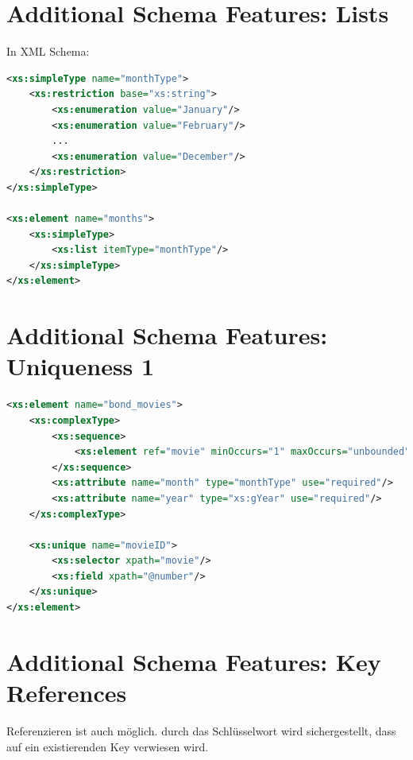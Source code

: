 \section{Additional Schema Features: Lists}
In XML Schema:
\begin{lstlisting}[language=XML, caption={Sequences with Global Definitions}]
<xs:simpleType name="monthType"> 
	<xs:restriction base="xs:string">
		<xs:enumeration value="January"/> 
		<xs:enumeration value="February"/> 
		...
		<xs:enumeration value="December"/> 
	</xs:restriction>
</xs:simpleType>

<xs:element name="months">
	<xs:simpleType>
		<xs:list itemType="monthType"/>
	</xs:simpleType>
</xs:element>
\end{lstlisting}

\section{Additional Schema Features: Uniqueness 1}

\begin{lstlisting}[language=XML, caption={Sequences with Global Definitions}]
<xs:element name="bond_movies"> 
	<xs:complexType>
		<xs:sequence>
			<xs:element ref="movie" minOccurs="1" maxOccurs="unbounded"/>
		</xs:sequence>
		<xs:attribute name="month" type="monthType" use="required"/> 
		<xs:attribute name="year" type="xs:gYear" use="required"/>
	</xs:complexType>
	
	<xs:unique name="movieID"> 
		<xs:selector xpath="movie"/> 
		<xs:field xpath="@number"/>
	</xs:unique>
</xs:element>
\end{lstlisting}

\section{Additional Schema Features: Key References}
Referenzieren ist auch möglich. durch das  Schlüsselwort wird sichergestellt, dass auf ein existierenden Key verwiesen wird.






